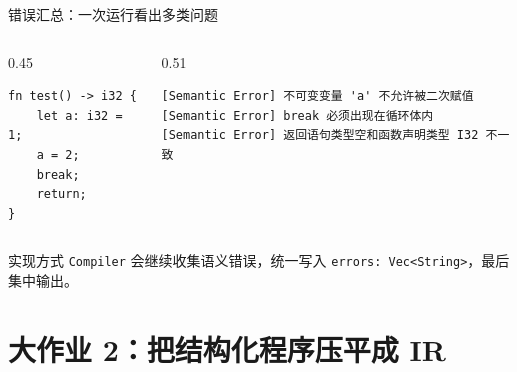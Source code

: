 \documentclass[aspectratio=169]{ctexbeamer}
\begin{document}
\begin{frame}[fragile]{错误汇总：一次运行看出多类问题}
    \begin{columns}[T]
    \begin{column}{0.45\textwidth}
        \begin{lstlisting}[style=tinycode]
fn test() -> i32 {
    let a: i32 = 1;
    a = 2;
    break;
    return;
}
        \end{lstlisting}
    \end{column}
    \begin{column}{0.51\textwidth}
        \begin{lstlisting}[style=tinycode]
[Semantic Error] 不可变变量 'a' 不允许被二次赋值
[Semantic Error] break 必须出现在循环体内
[Semantic Error] 返回语句类型空和函数声明类型 I32 不一致
        \end{lstlisting}
    \end{column}
    \end{columns}
    \vspace{0.2em}
    \begin{block}{实现方式}
        \texttt{Compiler} 会继续收集语义错误，统一写入 \texttt{errors: Vec<String>}，最后集中输出。
    \end{block}
\end{frame}

\section{大作业 2：把结构化程序压平成 IR}
\end{document}
